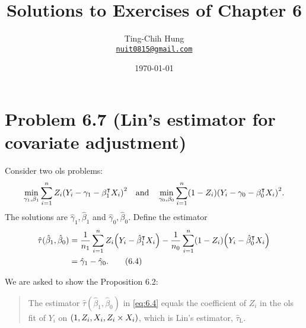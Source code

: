 \documentclass[10pt]{article}
\title{Solutions to Exercises of Chapter 6}
\author{Ting-Chih Hung \\ \href{mailto:nuit0815@gmail.com}{\texttt{nuit0815@gmail.com}}}
\date{\today}
\begin{document}
\maketitle

\section*{Problem 6.7 (Lin's estimator for covariate adjustment)}

Consider two \gls{ols} problems:
\begin{align*}
  \min_{\gamma_1, \beta_1} 
  \sum_{i=1}^n Z_i {\left( Y_i - \gamma_1 - \beta_1^\intercal X_i \right)}^2
  \quad \text{and} \quad
  \min_{\gamma_0, \beta_0} 
  \sum_{i=1}^n (1 - Z_i) {\left( Y_i - \gamma_0 - \beta_0^\intercal X_i \right)}^2.
\end{align*}
The solutions are $\hat{\gamma}_1, \hat{\beta}_1$ and $\hat{\gamma}_0, \hat{\beta}_0$.
Define the estimator
\begin{align}
  \hat{\tau}(\hat{\beta}_1, \hat{\beta}_0) 
  &= \frac{1}{n_1} \sum_{i=1}^n Z_i {\left( Y_i - \hat{\beta}_1^\intercal X_i \right)}
  - \frac{1}{n_0} \sum_{i=1}^n (1 - Z_i) {\left( Y_i - \hat{\beta}_0^\intercal X_i \right)} \notag \\
  &= \hat{\gamma}_1 - \hat{\gamma}_0.
  \tag{6.4}
  \label{eq:6.4}
\end{align}

We are asked to show the Proposition 6.2:
\begin{quote}
  The estimator $\hat{\tau}(\hat{\beta}_1, \hat{\beta}_0)$ 
  in \cref{eq:6.4} equals the coefficient of $Z_i$ in the \gls{ols}
  fit of $Y_i$ on ${\left( 1, Z_i, X_i, Z_i \times X_i \right)}$,
  which is Lin's estimator, $\hat{\tau}_{\text{L}}$.
\end{quote}
\end{document}
